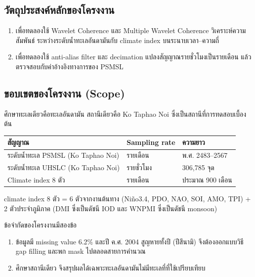 \documentclass[a4paper,12pt]{article}
\begin{document}
\subsection{วัตถุประสงค์หลักของโครงงาน}

\begin{enumerate}
  \item เพื่อทดลองใช้ Wavelet Coherence และ Multiple Wavelet Coherence วิเคราะห์ความสัมพันธ์
        ระหว่างระดับน้ำทะเลอันดามันกับ climate index บนระนาบเวลา--ความถี่
  \item เพื่อทดลองใช้ anti-alias filter และ decimation แปลงสัญญาณรายชั่วโมงเป็นรายเดือน
        แล้วตรวจสอบกับค่าอ้างอิงทางการของ PSMSL
\end{enumerate}
\clearpage
\subsection{ขอบเขตของโครงงาน (Scope)}

ศึกษาทะเลเดียวคือทะเลอันดามัน สถานีเดียวคือ Ko Taphao Noi ซึ่งเป็นสถานีที่การทดสอบเบื้องต้น

\begin{center}
\begin{tabular}{@{}L{7.4cm}L{3.0cm}L{4.0cm}@{}}
\toprule
\textbf{สัญญาณ} & \textbf{Sampling rate} & \textbf{ความยาว} \\
\midrule
ระดับน้ำทะเล PSMSL (Ko Taphao Noi) & รายเดือน   & พ.ศ. 2483--2567 \\
ระดับน้ำทะเล UHSLC (Ko Taphao Noi) & รายชั่วโมง & 306,785 จุด \\
Climate index 8 ตัว                & รายเดือน   & ประมาณ 900 เดือน \\
\bottomrule
\end{tabular}
\end{center}

climate index 8 ตัว = 6 ตัวจากงานต้นทาง (Niño3.4, PDO, NAO, SOI, AMO, TPI) + 2 ตัวประจำภูมิภาค
(DMI ซึ่งเป็นดัชนี IOD และ WNPMI ซึ่งเป็นดัชนี monsoon)

ข้อจำกัดของโครงงานมีสองข้อ

\begin{enumerate}
  \item ข้อมูลมี missing value 6.2\% และปี ค.ศ. 2004 สูญหายทั้งปี (ปีสึนามิ) จึงต้องออกแบบวิธี
        gap filling และพก mask ไปตลอดสายการคำนวณ
  \item ศึกษาสถานีเดียว จึงสรุปผลได้เฉพาะทะเลอันดามันไม่มีทะเลที่ที่ใช้เปรียบเทียบ
\end{enumerate}

\end{document}
